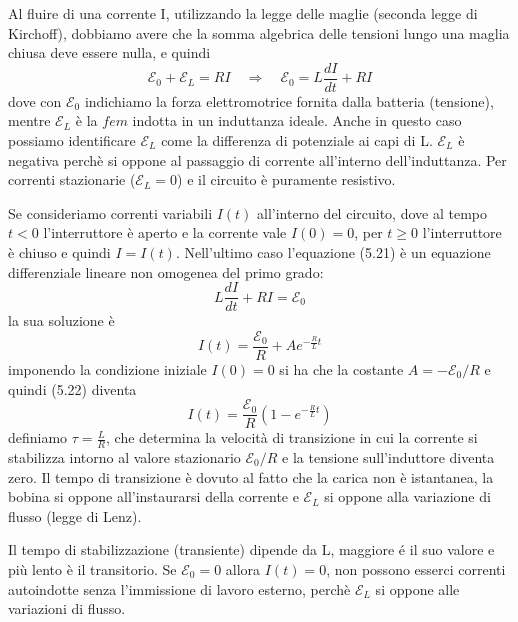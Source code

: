 Al fluire di una corrente I, utilizzando la legge delle maglie (seconda legge di Kirchoff), dobbiamo avere che la somma algebrica delle tensioni lungo una maglia chiusa deve essere nulla, e quindi 
\begin{equation}
	\mathcal{E}_0 + \mathcal{E}_{L} = RI \quad \Rightarrow \quad \mathcal{E}_0 = L\frac{d I}{dt} + RI
\end{equation}
dove con $\mathcal{E}_0$ indichiamo la forza elettromotrice fornita dalla batteria (tensione), mentre $\mathcal{E}_L$ \`e la $fem$ indotta in un induttanza ideale. Anche in questo caso possiamo identificare $\mathcal{E}_L$ come la differenza di potenziale ai capi di L.
$\mathcal{E}_L$ \`e negativa perch\`e si oppone al passaggio di corrente all'interno dell'induttanza. Per correnti stazionarie ($\mathcal{E}_L = 0$) e il circuito \`e puramente resistivo.
\newline

Se consideriamo correnti variabili $I(t)$ all'interno del circuito, dove al tempo $t<0$ l'interruttore \`e aperto e la corrente vale $I(0) = 0$, per $t \geq 0$ l'interruttore \`e chiuso e quindi $I =I(t)$. Nell'ultimo caso l'equazione (5.21) \`e un equazione differenziale lineare non omogenea del primo grado:
\begin{equation*}
	L \frac{dI}{dt} + RI = \mathcal{E}_0
\end{equation*}
la sua soluzione \`e
\begin{equation}
	I(t) = \frac{\mathcal{E}_0}{R} + A e^{-\frac{R}{L}t}
\end{equation} 
imponendo la condizione iniziale $I(0)=0$ si ha che la costante $A = - \mathcal{E}_0/R$ e quindi (5.22) diventa 
\begin{equation}
	I(t) = \frac{\mathcal{E}_0}{R}\left(1-e^{-\frac{R}{L}t}\right)
\end{equation}
definiamo $\tau = \frac{L}{R}$, che determina la velocit\`a di transizione in cui la corrente si stabilizza intorno al valore stazionario $\mathcal{E}_0/R$ e la tensione sull'induttore diventa zero. Il tempo di transizione \`e dovuto al fatto che la carica non \`e istantanea, la bobina  si oppone all'instaurarsi della corrente e $\mathcal{E}_L$ si oppone alla variazione di flusso (legge di Lenz).

Il tempo di stabilizzazione (transiente) dipende da L, maggiore \'e il suo valore e pi\`u lento  \`e il transitorio. Se $\mathcal{E}_0 = 0$ allora $I(t) = 0$, non possono esserci correnti autoindotte senza l'immissione di lavoro esterno, perch\`e $\mathcal{E}_{L}$ si oppone alle variazioni di flusso.

